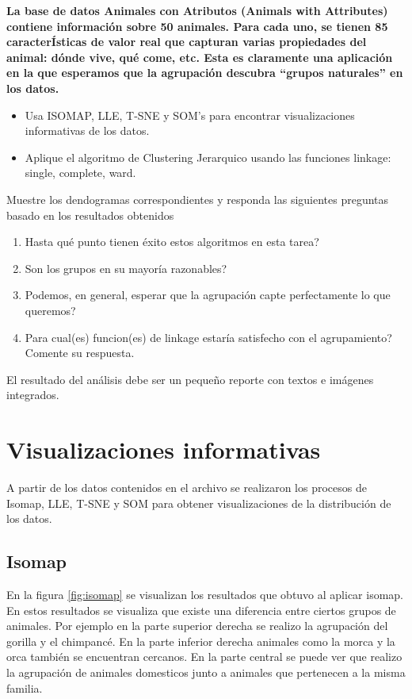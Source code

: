 \textbf{La base de datos Animales con Atributos (Animals with Attributes) contiene información sobre 50 animales. Para cada uno, se tienen 85 caracterÍsticas de valor real que capturan varias propiedades del animal: dónde vive, qué come, etc. Esta es claramente una aplicación en la que esperamos que la agrupación descubra “grupos naturales” en los datos.}

\begin{itemize}
    \item Usa ISOMAP, LLE, T-SNE y SOM's para encontrar visualizaciones informativas de los datos.
    \item Aplique el algoritmo de Clustering Jerarquico usando las funciones linkage: single, complete,
          ward.
\end{itemize}
Muestre los dendogramas correspondientes y responda las siguientes preguntas basado en los resultados obtenidos

\begin{enumerate}
    \item Hasta qué punto tienen éxito estos algoritmos en esta tarea?
    \item Son los grupos en su mayoría razonables?
    \item Podemos, en general, esperar que la agrupación capte perfectamente lo que queremos?
    \item Para cual(es) funcion(es) de linkage estaría satisfecho con el agrupamiento? Comente su respuesta.
\end{enumerate}

El resultado del análisis debe ser un pequeño reporte con textos e imágenes integrados.

\section*{Visualizaciones informativas}

A partir de los datos contenidos en el archivo  se realizaron los procesos de Isomap, LLE, T-SNE y SOM para obtener visualizaciones de la distribución de los datos.

\subsection*{Isomap}

En la figura \ref{fig:isomap} se visualizan los resultados que obtuvo al aplicar isomap. En estos resultados se visualiza que existe una diferencia entre ciertos grupos de animales. Por ejemplo en la parte superior derecha se realizo la agrupación del gorilla y el chimpancé. En la parte inferior derecha animales como la morca y la orca también se encuentran cercanos. En la parte central se puede ver que realizo la agrupación de animales domesticos junto a animales que pertenecen a la misma familia.

